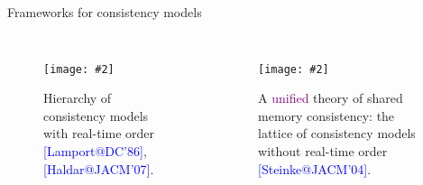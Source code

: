 \documentclass{beamer}
\makeatletter
\newcommand{\citeinbeamer}[3]{{\scriptsize{\textcolor{blue}{[#1@#2'#3]}}}}
\newcommand{\fig}[3]
{
  \begin{figure}[htp]
    \centering
      \texttt{[image: \#2]}
      \caption[labelInTOC]{#3}
  \end{figure}
}
\newcommand{\largepurple}[1]{\textcolor{purple}{\large #1}}
\newcommand{\boxedpoint}[1]{
  \begin{center}
    \fbox{\textcolor{red}{\bf #1}}
  \end{center}
}
\makeatother
\begin{document}

\begin{frame}{Frameworks for consistency models}
  \begin{columns}
	  \fig{width = 0.50\textwidth}{fig/framework-timed-consistency.png}
	  {Hierarchy of consistency models with real-time order
	  \citeinbeamer{Lamport}{DC}{86}, \citeinbeamer{Haldar}{JACM}{07}.}
	  \fig{width = 0.70\textwidth}{fig/consistencylattice.png}
	  {A \largepurple{unified} theory of shared memory consistency: the lattice of
	  consistency models without real-time order \citeinbeamer{Steinke}{JACM}{04}.}
  \end{columns}
\end{frame}

%
\end{document}

